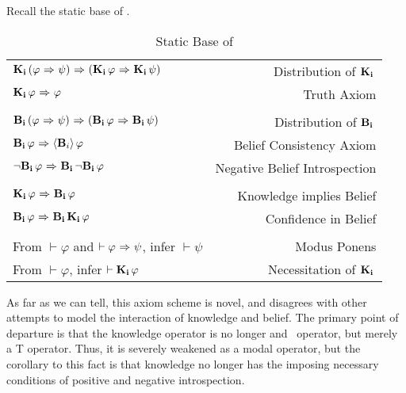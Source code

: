 Recall the static base of \DASL.

\begin{table}[H]
	\begin{center}
		\begin{tabular}{| l r |}
			\hline
			$\mathbf{K}_{\mathbf{i}}\,(\varphi {\ \Rightarrow \ } \psi) {\ \Rightarrow \ } (\mathbf{K}_{\mathbf{i}}\,\varphi {\ \Rightarrow \ } \mathbf{K}_{\mathbf{i}}\,\psi)$ & Distribution of $\mathbf{K}_{\mathbf{i}}\,$ \\
			$\mathbf{K}_{\mathbf{i}}\,\varphi {\ \Rightarrow \ } \varphi$ & Truth Axiom \\
			&\\
			$\mathbf{B}_{\mathbf{i}}\,(\varphi {\ \Rightarrow \ } \psi) {\ \Rightarrow \ } (\mathbf{B}_{\mathbf{i}}\,\varphi {\ \Rightarrow \ } \mathbf{B}_{\mathbf{i}}\,\psi)$ & Distribution of $\mathbf{B}_{\mathbf{i}}\,$\\
			$\mathbf{B}_{\mathbf{i}}\,\varphi {\ \Rightarrow \ } \langle \mathbf{B}_{i} \rangle\,\varphi$ & Belief Consistency Axiom\\
			${\neg}\mathbf{B}_{\mathbf{i}}\,\varphi {\ \Rightarrow \ } \mathbf{B}_{\mathbf{i}}\,{\neg}\mathbf{B}_{\mathbf{i}}\,\varphi$ & Negative Belief Introspection\\
			&\\
			$\mathbf{K}_{\mathbf{i}}\,\varphi {\ \Rightarrow \ } \mathbf{B}_{\mathbf{i}}\,\varphi$ & Knowledge implies Belief \\
			$\mathbf{B}_{\mathbf{i}}\,\varphi {\ \Rightarrow \ } \mathbf{B}_{\mathbf{i}}\,\mathbf{K}_{\mathbf{i}}\,\varphi$ & Confidence in Belief\\
			&\\
			From $\vdash \varphi$ and $\vdash \varphi {\ \Rightarrow \ } \psi$, infer $\vdash\psi$ & Modus Ponens\\
			From $\vdash \varphi$, infer $\vdash \mathbf{K}_{\mathbf{i}}\,\varphi$ & Necessitation of $\mathbf{K}_{\mathbf{i}}\,$\\
			\hline
		\end{tabular}
		\caption{Static Base of \DASL}
	\end{center}
\end{table}

As far as we can tell, this axiom scheme is novel, and disagrees with other attempts to model the interaction of knowledge and belief. The primary point of departure is that the knowledge operator is no longer and \SFive\ operator, but merely a T operator. Thus, it is severely weakened as a modal operator, but the corollary to this fact is that knowledge no longer has the imposing necessary conditions of positive and negative introspection. 



